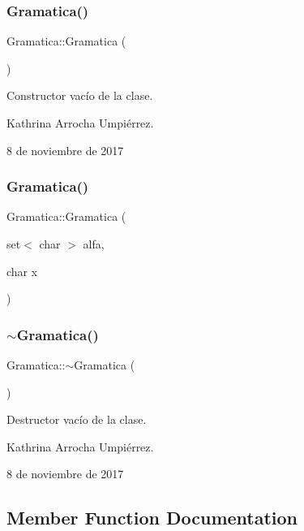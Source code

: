 \subsubsection{\texorpdfstring{Gramatica()}{Gramatica()}\hspace{0.1cm}{\footnotesize\ttfamily [1/2]}}
{\footnotesize\ttfamily Gramatica\+::\+Gramatica (\begin{DoxyParamCaption}{ }\end{DoxyParamCaption})}

Constructor vacío de la clase.

Kathrina Arrocha Umpiérrez.

8 de noviembre de 2017 \mbox{\label{class_gramatica_ae9176ae1de55840b18642b1428bea25a}} 
\subsubsection{\texorpdfstring{Gramatica()}{Gramatica()}\hspace{0.1cm}{\footnotesize\ttfamily [2/2]}}
{\footnotesize\ttfamily Gramatica\+::\+Gramatica (\begin{DoxyParamCaption}\item[{set$<$ char $>$}]{alfa,  }\item[{char}]{x }\end{DoxyParamCaption})}

\mbox{\label{class_gramatica_a25b75ecf041599ef652ff37156db1e17}} 
\subsubsection{\texorpdfstring{$\sim$\+Gramatica()}{~Gramatica()}}
{\footnotesize\ttfamily Gramatica\+::$\sim$\+Gramatica (\begin{DoxyParamCaption}{ }\end{DoxyParamCaption})}

Destructor vacío de la clase.

Kathrina Arrocha Umpiérrez.

8 de noviembre de 2017 

\subsection{Member Function Documentation}
\mbox{\label{class_gramatica_ada4af4c0eba8a829a98417168e93d2db}} 
